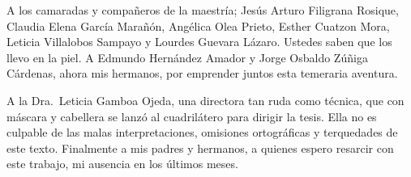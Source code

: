 \documentclass[14pt,twoside,final]{extbook} %
\begin{document}
A los camaradas y compañeros de la maestría; Jesús Arturo Filigrana Rosique, Claudia Elena García Marañón, Angélica Olea Prieto, Esther Cuatzon Mora, Leticia Villalobos Sampayo y Lourdes Guevara Lázaro. Ustedes saben que los llevo en la piel. A Edmundo Hernández Amador y Jorge Osbaldo Zúñiga Cárdenas, ahora mis hermanos, por emprender juntos esta temeraria aventura.

A la Dra.~Leticia Gamboa Ojeda, una directora tan ruda como técnica, que con máscara y cabellera se lanzó al cuadrilátero para dirigir la tesis. Ella no es culpable de las malas interpretaciones, omisiones ortográficas y terquedades de este texto. Finalmente a mis padres y hermanos, a quienes espero resarcir con este trabajo, mi ausencia en los últimos meses.
\cleardoublepage %
\makeatletter
\renewcommand\@dotsep{200} %
\makeatother
\renewcommand{\contentsname}{Índice de contenidos}
\thispagestyle{empty}
\pagestyle{fancy}
\fancyhf{} %
\fancyhead[RO,LE]{\thepage}
\fancyfoot{}
\renewcommand{\headrulewidth}{0pt}
\setcounter{page}{11}
\cleardoublepage
\tableofcontents
\makeatletter
\renewcommand\@dotsep{200} %
\makeatother
\renewcommand{\listtablename}{Índice de cuadros}
\listoftables
\thispagestyle{empty}
\pagestyle{fancy}
\fancyhf{} %
\fancyhead[RO,LE]{\thepage}
\fancyfoot{}
\renewcommand{\headrulewidth}{0pt}
\setcounter{page}{13}
\makeatletter
\renewcommand\@dotsep{200} %
\makeatother
\renewcommand{\listfigurename}{Índice de imágenes}
\listoffigures
\thispagestyle{empty}
\pagestyle{fancy}
\fancyhf{} %
\fancyhead[RO,LE]{\thepage}
\fancyfoot{}
\renewcommand{\headrulewidth}{0pt}
\setcounter{page}{15}
\end{document}
